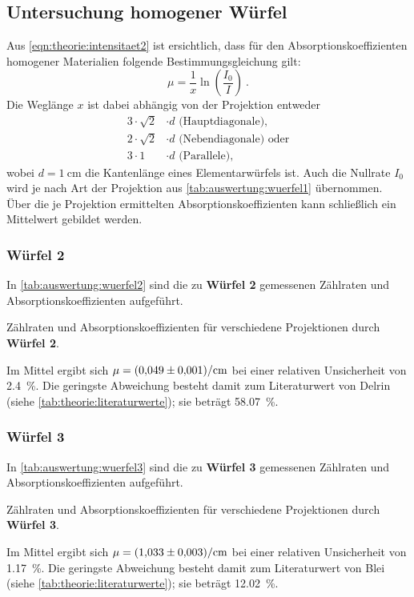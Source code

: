 \subsection{Untersuchung homogener Würfel}
Aus \autoref{eqn:theorie:intensitaet2} ist ersichtlich,
dass für den Absorptionskoeffizienten homogener Materialien folgende Bestimmungsgleichung gilt:
\begin{equation*}
    \mu = \frac{1}{x} \ln \left( \frac{I_0}{I} \right) \ .
\end{equation*}
Die Weglänge $x$ ist dabei abhängig von der Projektion entweder
\begin{align*}
    3·\sqrt{2}&·d \text{ (Hauptdiagonale),} \\
    2·\sqrt{2}&·d \text{ (Nebendiagonale) oder} \\
    3·1       &·d \text{ (Parallele),}
\end{align*}
wobei $d = \SI{1}{\centi\meter}$ die Kantenlänge eines Elementarwürfels ist.
Auch die Nullrate $I_0$ wird je nach Art der Projektion aus \autoref{tab:auswertung:wuerfel1} übernommen.
Über die je Projektion ermittelten Absorptionskoeffizienten kann schließlich ein Mittelwert gebildet werden.


\subsubsection{\textbf{Würfel 2}}
In \autoref{tab:auswertung:wuerfel2} sind die zu \textbf{Würfel 2} gemessenen Zählraten und Absorptionskoeffizienten aufgeführt.
\begin{table}[H]
    \centering
    \caption{Zählraten und Absorptionskoeffizienten für verschiedene Projektionen durch \textbf{Würfel 2}.}
    \label{tab:auswertung:wuerfel2}
\end{table}
Im Mittel ergibt sich $\mu = \SI{0.049 \pm 0.001}{\per\centi\meter}$
bei einer relativen Unsicherheit von \SI{2.4}{\percent}.
Die geringste Abweichung besteht damit zum Literaturwert von Delrin (siehe \autoref{tab:theorie:literaturwerte});
sie beträgt \SI{58.07}{\percent}.


\subsubsection{\textbf{Würfel 3}}
In \autoref{tab:auswertung:wuerfel3} sind die zu \textbf{Würfel 3} gemessenen Zählraten und Absorptionskoeffizienten aufgeführt.
\begin{table}[H]
    \centering
    \caption{Zählraten und Absorptionskoeffizienten für verschiedene Projektionen durch \textbf{Würfel 3}.}
    \label{tab:auswertung:wuerfel3}
\end{table}
Im Mittel ergibt sich $\mu = \SI{1.033 \pm 0.003}{\per\centi\meter}$
bei einer relativen Unsicherheit von \SI{1.17}{\percent}.
Die geringste Abweichung besteht damit zum Literaturwert von Blei (siehe \autoref{tab:theorie:literaturwerte});
sie beträgt \SI{12.02}{\percent}.


